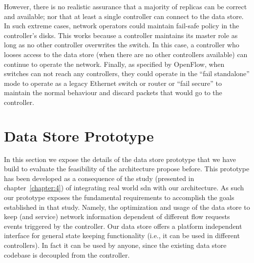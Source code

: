 However, there is no realistic assurance that a majority of replicas can be correct and available; nor that at least a single controller can connect to the data store. 
In such extreme cases, network operators could maintain fail-safe policy  in the controller's disks. 
This works because a controller maintains its master role as long as no other controller overwrites the switch. 
In this case, a controller who looses access to the data store (when there are no other controllers available) can continue to operate the network. 
Finally, as specified by OpenFlow,  when switches can not reach any controllers, they  could operate in the ``fail standalone'' mode to operate as a legacy Ethernet switch or router or ``fail secure'' to maintain the normal behaviour and discard packets that would go to the controller. 









\section{Data Store Prototype}
\glsresetall 
\label{sec:data-store-prototype}
In this section we expose  the details of the data store prototype that we have build to evaluate the feasibility of the architecture propose before. 
This prototype has been developed as a consequence of the study (presented in chapter~\ref{chapter:4}) of integrating real world \gls{sdn} with our architecture. 
As such our prototype exposes the fundamental requirements to accomplish the goals established in that study. Namely, the optimization and usage of the data store to keep (and service) network information dependent of different flow requests events triggered by the controller. 
Our data store offers a platform independent interface for general state keeping functionality (i.e., it can be used in different controllers). 
In fact it can be used by anyone, since the existing data store codebase  is decoupled from the controller. 


